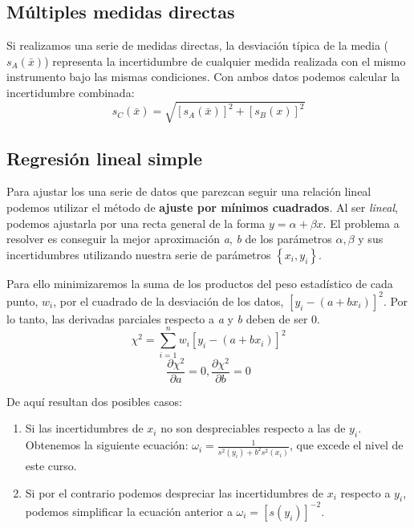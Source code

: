 \documentclass[12pt, a4paper, titlepage]{article}
\begin{document}
  \subsection{Múltiples medidas directas}

  Si realizamos una serie de medidas directas, la desviación típica de la media ($s_A (\bar{x})$) representa la incertidumbre de cualquier medida realizada con el mismo instrumento bajo las mismas condiciones. Con ambos datos podemos calcular la incertidumbre combinada:
  \begin{equation} \label{ec:scx}
    s_C (\bar{x}) = \sqrt{\left[ s_A (\bar{x}) \right]^2 + \left[ s_B (x) \right]^2}
  \end{equation}

  \subsection{Regresión lineal simple}
  \label{sec:reglin}

  Para ajustar los una serie de datos que parezcan seguir una relación lineal podemos utilizar el método de \textbf{ajuste por mínimos cuadrados}. Al ser \textit{lineal}, podemos ajustarla por una recta general de la forma $y = \alpha + \beta x$. El problema a resolver es conseguir la mejor aproximación \textit{a}, \textit{b} de los parámetros $\alpha, \beta$ y sus incertidumbres utilizando nuestra serie de parámetros $\left\{ x_i, y_i \right\}$.

  Para ello minimizaremos la suma de los productos del peso estadístico de cada punto, $w_i$, por el cuadrado de la desviación de los datos, $[y_i - (a + bx_i)]^2$. Por lo tanto, las derivadas parciales respecto a \textit{a} y \textit{b} deben de ser 0.
  \begin{equation} \label{ec:chi2}
    \chi^2 = \sum^{n}_{i=1} w_i[y_i - (a + bx_i)]^2
  \end{equation}
  \begin{equation} \label{ec:deriv}
    \frac{\partial \chi^2}{\partial a}=0, \frac{\partial \chi^2}{\partial b}=0
  \end{equation}

  De aquí resultan dos posibles casos:

  \begin{enumerate}
    \item Si las incertidumbres de $x_i$ no son despreciables respecto a las de $y_i$. Obtenemos la siguiente ecuación: $\omega_i=\frac{1}{s^2(y_i)+b^2s^2(x_i)}$, que excede el nivel de este curso.
    \item Si por el contrario podemos despreciar las incertidumbres de $x_i$ respecto a $y_i$, podemos simplificar la ecuación anterior a $\omega_i=[s(y_i)]^{-2}$.
  \end{enumerate}
\end{document}
